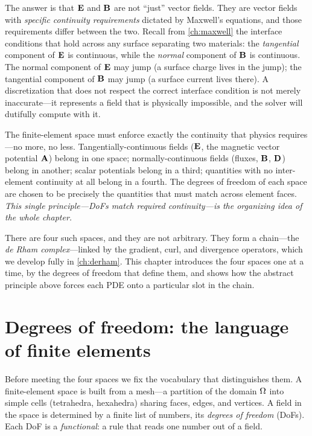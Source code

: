 The answer is that $\mathbf{E}$ and $\mathbf{B}$ are not ``just'' vector fields. They are vector
fields with \emph{specific continuity requirements} dictated by Maxwell's
equations, and those requirements differ between the two. Recall from
\cref{ch:maxwell} the interface conditions that hold across any surface separating
two materials: the \emph{tangential} component of $\mathbf{E}$ is continuous, while the
\emph{normal} component of $\mathbf{B}$ is continuous. The normal component of $\mathbf{E}$ may
jump (a surface charge lives in the jump); the tangential component of $\mathbf{B}$ may
jump (a surface current lives there). A discretization that does not respect the
correct interface condition is not merely inaccurate---it represents a field that
is physically impossible, and the solver will dutifully compute with it.

\begin{keyidea}
The finite-element space must enforce exactly the continuity that physics
requires---no more, no less. Tangentially-continuous fields ($\mathbf{E}$, the magnetic
vector potential $\mathbf{A}$) belong in one space; normally-continuous fields (fluxes,
$\mathbf{B}$, $\mathbf{D}$) belong in another; scalar potentials belong in a third; quantities
with no inter-element continuity at all belong in a fourth. The degrees of freedom
of each space are chosen to be precisely the quantities that must match across
element faces. \emph{This single principle---DoFs match required continuity---is
the organizing idea of the whole chapter.}
\end{keyidea}

There are four such spaces, and they are not arbitrary. They form a chain---the
\emph{de Rham complex}---linked by the gradient, curl, and divergence operators,
which we develop fully in \cref{ch:derham}. This chapter introduces the four spaces
one at a time, by the degrees of freedom that define them, and shows how the
abstract principle above forces each PDE onto a particular slot in the chain.

\section{Degrees of freedom: the language of finite elements}

Before meeting the four spaces we fix the vocabulary that distinguishes them. A
finite-element space is built from a mesh---a partition of the domain $\Omega$ into
simple cells (tetrahedra, hexahedra) sharing faces, edges, and vertices. A field in
the space is determined by a finite list of numbers, its \emph{degrees of freedom}
(DoFs). Each DoF is a \emph{functional}: a rule that reads one number out of a
field.

